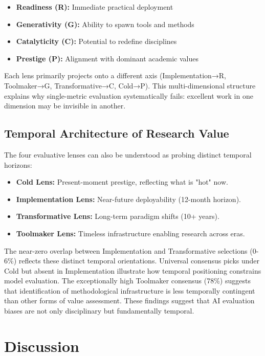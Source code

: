 \documentclass{article}
\begin{document}
\begin{itemize}
    \item \textbf{Readiness (R):} Immediate practical deployment
    \item \textbf{Generativity (G):} Ability to spawn tools and methods
    \item \textbf{Catalyticity (C):} Potential to redefine disciplines
    \item \textbf{Prestige (P):} Alignment with dominant academic values
\end{itemize}

Each lens primarily projects onto a different axis (Implementation→R, Toolmaker→G, Transformative→C, Cold→P). This multi-dimensional structure explains why single-metric evaluation systematically fails: excellent work in one dimension may be invisible in another.

\subsection{Temporal Architecture of Research Value}

The four evaluative lenses can also be understood as probing distinct temporal horizons:

\begin{itemize}
    \item \textbf{Cold Lens:} Present-moment prestige, reflecting what is "hot" now.
    \item \textbf{Implementation Lens:} Near-future deployability (12-month horizon).
    \item \textbf{Transformative Lens:} Long-term paradigm shifts (10+ years).
    \item \textbf{Toolmaker Lens:} Timeless infrastructure enabling research across eras.
\end{itemize}

The near-zero overlap between Implementation and Transformative selections (0-6\%) reflects these distinct temporal orientations. Universal consensus picks under Cold but absent in Implementation illustrate how temporal positioning constrains model evaluation. The exceptionally high Toolmaker consensus (78\%) suggests that identification of methodological infrastructure is less temporally contingent than other forms of value assessment. These findings suggest that AI evaluation biases are not only disciplinary but fundamentally temporal.

\section{Discussion}
\end{document}
